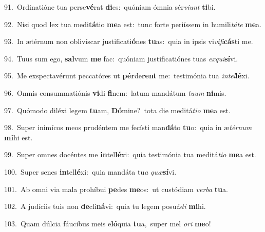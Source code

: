 {\numbfont\textcolor{\numbcolor}{91.}}~Ordinatióne tua perse\-\textbf{vé}\-rat \textbf{di}\-es:~\star quóniam ómnia sér\-\textit{vi}\-\textit{unt} \textbf{ti}\-bi.\par
{\numbfont\textcolor{\numbcolor}{92.}}~Nisi quod lex tua medi\-\textbf{tá}\-tio \textbf{me}\-a est:~\star tunc forte periíssem in humili\-\textit{tá}\-\textit{te} \textbf{me}\-a.\par
{\numbfont\textcolor{\numbcolor}{93.}}~In ætérnum non oblivíscar justificati\-\textbf{ó}\-nes \textbf{tu}\-as:~\star quia in ipsis vi\-\textit{vi}\-\textit{fi}\textbf{cás}ti me.\par
{\numbfont\textcolor{\numbcolor}{94.}}~Tuus sum ego, \textbf{sal}\-vum \textbf{me} fac:~\star quóniam justificatiónes tuas \textit{ex}\-\textit{qui}\textbf{sí}vi.\par
{\numbfont\textcolor{\numbcolor}{95.}}~Me exspectavérunt peccatóres ut \textbf{pér}\-de\textbf{rent} me:~\star testimónia tua \textit{in}\-\textit{tel}\textbf{lé}xi.\par
{\numbfont\textcolor{\numbcolor}{96.}}~Omnis consummatiónis \textbf{vi}\-di \textbf{fi}\-nem:~\star latum mandátum \textit{tu}\-\textit{um} \textbf{ni}\-mis.\par
{\numbfont\textcolor{\numbcolor}{97.}}~Quómodo diléxi legem \textbf{tu}\-am, \textbf{Dó}\-mine?~\star tota die meditá\-\textit{ti}\-\textit{o} \textbf{me}\-a est.\par
{\numbfont\textcolor{\numbcolor}{98.}}~Super inimícos meos prudéntem me fecísti man\-\textbf{dá}\-to \textbf{tu}\-o:~\star quia in æ\-\textit{tér}\-\textit{num} \textbf{mi}\-hi est.\par
{\numbfont\textcolor{\numbcolor}{99.}}~Super omnes docéntes me \textbf{in}\-tel\-\textbf{lé}\-xi:~\star quia testimónia tua meditá\-\textit{ti}\-\textit{o} \textbf{me}\-a est.\par
{\numbfont\textcolor{\numbcolor}{100.}}~Super senes \textbf{in}\-tel\-\textbf{lé}\-xi:~\star quia mandáta tu\textit{a} \textit{quæ}\-\textbf{sí}vi.\par
{\numbfont\textcolor{\numbcolor}{101.}}~Ab omni via mala prohíbui \textbf{pe}\-des \textbf{me}\-os:~\star ut custódiam \textit{ver}\-\textit{ba} \textbf{tu}\-a.\par
{\numbfont\textcolor{\numbcolor}{102.}}~A judíciis tuis non \textbf{de}\-cli\-\textbf{ná}\-vi:~\star quia tu legem posu\-\textit{ís}\-\textit{ti} \textbf{mi}\-hi.\par
{\numbfont\textcolor{\numbcolor}{103.}}~Quam dúlcia fáucibus meis e\-\textbf{ló}\-quia \textbf{tu}\-a,~\star super mel \textit{o}\-\textit{ri} \textbf{me}\-o!\par
